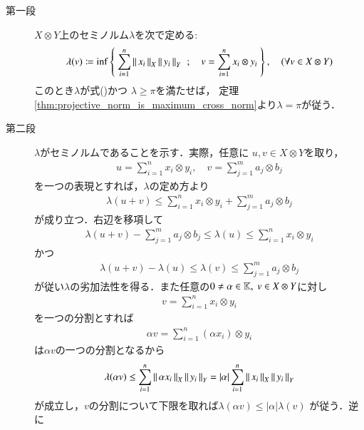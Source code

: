 	\begin{prf}\mbox{}
		\begin{description}
			\item[第一段]
				$X \otimes Y$上のセミノルム$\lambda$を次で定める:
				\begin{align}
					\lambda(v) \coloneqq \operatorname*{inf}_{} \left\{\ \sum_{i=1}^n \left\|\, x_i\, \right\|_{X}\left\|\, y_i\, \right\|_{Y}\ \, ; \quad 
					v = \sum_{i=1}^n x_i \otimes y_i\ \right\},
					\quad (\forall v \in X \otimes Y)
				\end{align}
				このとき$\lambda$が式()かつ
				$\lambda \geq \pi$を満たせば，
				定理\ref{thm:projective_norm_is_maximum_cross_norm}より$\lambda = \pi$が従う．
				
			\item[第二段]
				$\lambda$がセミノルムであることを示す．実際，任意に
				$u,v \in X \otimes Y$を取り，
				\begin{align}
					u = \sum_{i=1}^{n} x_i \otimes y_i,
					\quad v = \sum_{j=1}^m a_j \otimes b_j
				\end{align}
				を一つの表現とすれば，$\lambda$の定め方より
				\begin{align}
					\lambda(u+v) \leq \sum_{i=1}^{n} x_i \otimes y_i + \sum_{j=1}^{m} a_j \otimes b_j
				\end{align}
				が成り立つ．右辺を移項して
				\begin{align}
					\lambda(u+v) - \sum_{j=1}^{m} a_j \otimes b_j \leq \lambda(u) \leq \sum_{i=1}^{n} x_i \otimes y_i
				\end{align}
				かつ
				\begin{align}
					\lambda(u+v) - \lambda(u) \leq \lambda(v) \leq \sum_{j=1}^{m} a_j \otimes b_j
				\end{align}
				が従い$\lambda$の劣加法性を得る．また任意の$0 \neq \alpha \in \mathbb{K},\ v \in X \otimes Y$に対し
				\begin{align}
					v = \sum_{i=1}^n x_i \otimes y_i
				\end{align}
				を一つの分割とすれば
				\begin{align}
					\alpha v = \sum_{i=1}^n (\alpha x_i) \otimes y_i
				\end{align}
				は$\alpha v$の一つの分割となるから
				\begin{align}
					\lambda(\alpha v) \leq \sum_{i=1}^n \left\|\, \alpha x_i\, \right\|_{X} \left\|\, y_i\, \right\|_{Y}
					= |\alpha| \sum_{i=1}^n \left\|\, x_i\, \right\|_{X} \left\|\, y_i\, \right\|_{Y}
				\end{align}
				が成立し，$v$の分割について下限を取れば$\lambda(\alpha v) \leq |\alpha| \lambda(v)$
				が従う．逆に

\end{description}
\end{prf}
